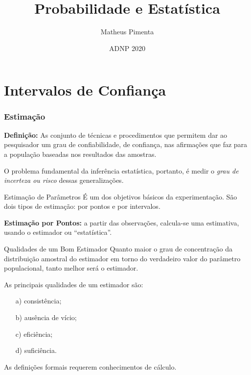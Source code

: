 \documentclass[hyperref={pdfpagelabels=false}]{beamer}
\title{Probabilidade e Estatística}
\author[Matheus Pimenta]{Matheus Pimenta}
\institute[UTFPR-CP]{\normalsize Universidade Tecnológica Federal do Paraná \\
	Câmpus Cornélio Procópio
}
\date{ADNP 2020}
\begin{document}
	
\begin{frame}
\titlepage
\end{frame} 




\section{Intervalos de Confiança} 

\begin{frame}
\frametitle{Estimação}
\textbf{Definição:} As conjunto de técnicas e procedimentos que permitem dar ao pesquisador um grau de confiabilidade, de confiança, nas afirmações que faz para a população baseadas nos resultados das amostras.

\pause
O problema fundamental da inferência estatística, portanto, é medir o \emph{grau de incerteza ou risco} dessas generalizações.

\end{frame}

\begin{frame}{Estimação de Parâmetros}
É um dos objetivos básicos da experimentação. São dois tipos de estimação: por pontos e por intervalos.

\pause

{\bf Estimação por Pontos:} a partir das observações, calcula-se uma estimativa, usando o estimador ou ``estatística''.
\end{frame}

\begin{frame}{Qualidades de um Bom Estimador}
Quanto maior o grau de concentração da distribuição amostral do estimador em torno do verdadeiro valor do parâmetro populacional, tanto melhor será o estimador.

\pause
As principais qualidades de um estimador são:
\pause
\begin{enumerate}
	\item [a)] consistência;\pause
	\item [b)] ausência de vício; \pause
	\item [c)] eficiência; \pause
	\item [d)] suficiência.
\end{enumerate}

\pause
As definições formais requerem conhecimentos de cálculo.
\end{frame}
\end{document}
